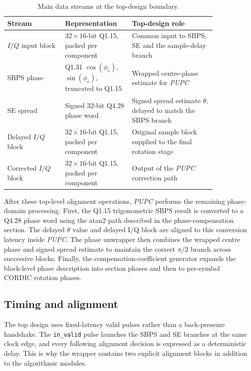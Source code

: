 \begin{table}[H]
    \centering
    \caption{Main data streams at the top-design boundary.}
    \label{tab:top-design-streams}
    \small
    \begin{tabular}{p{0.24\linewidth} p{0.26\linewidth} p{0.35\linewidth}}
        \hline
        Stream & Representation & Top-design role \\
        \hline
        \(I/Q\) input block & \(32 \times 16\)-bit Q1.15, packed per component & Common input to \ac{SBPS}, \ac{SE} and the sample-delay branch \\
        \ac{SBPS} phase & Q1.31 \(\cos(\phi_e)\), \(\sin(\phi_e)\), truncated to Q1.15 & Wrapped centre-phase estimate for \textit{PUPC} \\
        \ac{SE} spread & Signed 32-bit Q4.28 phase word & Signed spread estimate \(\theta\), delayed to match the \ac{SBPS} branch \\
        Delayed \(I/Q\) block & \(32 \times 16\)-bit Q1.15, packed per component & Original sample block supplied to the final rotation stage \\
        Corrected \(I/Q\) block & \(32 \times 16\)-bit Q1.15, packed per component & Output of the \textit{PUPC} correction path \\
        \hline
    \end{tabular}
\end{table}

After these top-level alignment operations, \textit{PUPC} performs the remaining phase-domain processing. First, the Q1.15 trigonometric \ac{SBPS} result is converted to a Q4.28 phase word using the atan2 path described in the phase-compensation section. The delayed \(\theta\) value and delayed I/Q block are aligned to this conversion latency inside \textit{PUPC}. The phase unwrapper then combines the wrapped centre phase and signed spread estimate to maintain the correct \(\pi/2\) branch across successive blocks. Finally, the compensation-coefficient generator expands the block-level phase description into section phases and then to per-symbol \ac{CORDIC} rotation phases.

\subsection{Timing and alignment}

The top design uses fixed-latency valid pulses rather than a back-pressure handshake. The \texttt{in\_valid} pulse launches the \ac{SBPS} and \ac{SE} branches at the same clock edge, and every following alignment decision is expressed as a deterministic delay. This is why the wrapper contains two explicit alignment blocks in addition to the algorithmic modules.

